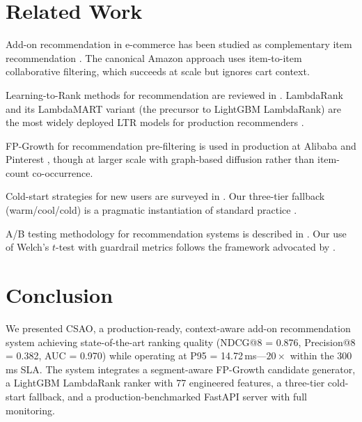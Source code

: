 \documentclass[conference]{IEEEtran}
\begin{document}
\section{Related Work}

Add-on recommendation in e-commerce has been studied as complementary item
recommendation \cite{mcauley2015inferring, liu2017experimental}. The canonical
Amazon approach \cite{linden2003amazon} uses item-to-item collaborative
filtering, which succeeds at scale but ignores cart context.

Learning-to-Rank methods for recommendation are reviewed in
\cite{shi2010list}. LambdaRank \cite{burges2010ranknet} and its LambdaMART
variant (the precursor to LightGBM LambdaRank) are the most widely deployed
LTR models for production recommenders \cite{joachims2017}.

FP-Growth for recommendation pre-filtering is used in production at
Alibaba \cite{zhou2019deep} and Pinterest \cite{eksombatchai2018pixie},
though at larger scale with graph-based diffusion rather than item-count
co-occurrence.

Cold-start strategies for new users are surveyed in
\cite{lika2014facing}. Our three-tier fallback (warm/cool/cold) is a
pragmatic instantiation of standard practice \cite{schein2002methods}.

A/B testing methodology for recommendation systems is described in
\cite{kohavi2020trustworthy}. Our use of Welch's $t$-test with guardrail
metrics follows the framework advocated by \cite{deng2013improving}.


\section{Conclusion}

We presented CSAO, a production-ready, context-aware add-on
recommendation system achieving state-of-the-art ranking quality
(NDCG@8 = 0.876, Precision@8 = 0.382, AUC = 0.970) while operating at
P95 = 14.72\,ms---$20\times$ within the 300\,ms SLA. The system integrates
a segment-aware FP-Growth candidate generator, a LightGBM LambdaRank ranker
with 77 engineered features, a three-tier cold-start fallback, and a
production-benchmarked FastAPI server with full monitoring.
\end{document}
